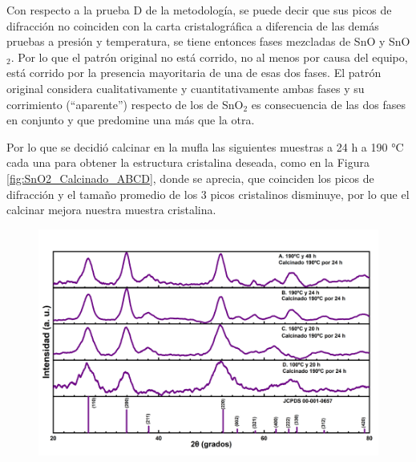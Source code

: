 \documentclass[12pt]{article}
\begin{document}
Con respecto a la prueba D de la metodología, se puede decir que sus picos de difracción no coinciden con la carta cristalográfica a diferencia de las demás pruebas a presión y temperatura, se tiene entonces fases mezcladas de SnO y SnO$\displaystyle _{2}$. Por lo que el patrón original no está corrido, no al menos por causa del equipo, está corrido por la presencia mayoritaria de una de esas dos fases. El patrón original considera cualitativamente y cuantitativamente ambas fases y su corrimiento (“aparente”) respecto de los de SnO$\displaystyle _{2}$ es consecuencia de las dos fases en conjunto y que predomine una más que la otra.\vspace{1em} %

Por lo que se decidió calcinar en la mufla las siguientes muestras a 24 h a 190 °C cada una para obtener la estructura cristalina deseada, como en la Figura \ref{fig:SnO2_Calcinado_ABCD}, donde se aprecia, que coinciden los picos de difracción y el tamaño promedio de los 3 picos cristalinos disminuye, por lo que el calcinar mejora nuestra muestra cristalina.\vspace{1em} %


\begin{figure}[H]
    	   \begin{center}
     	  	\includegraphics[width = 1\textwidth]{Imagenes/SnO2_Calcinado_ABCD.png}
    	   \end{center} 
        \end{figure}
\end{document}
